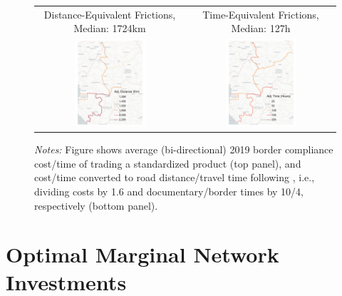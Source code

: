 \documentclass[a4paper]{article}
\begin{document}
\begin{figure}[H]
{\begin{tabular}{cc}
Distance-Equivalent Frictions, Median: 1724km & Time-Equivalent Frictions, Median: 127h \\
\includegraphics[width=0.5\textwidth, trim= {1cm 0 1cm 0}, clip]{"../figures/trade_costs/DBS_border_dist_km_adj_map.pdf"}  & 
\includegraphics[width=0.5\textwidth, trim= {1cm 0 1cm 0}, clip]{"../figures/trade_costs/DBS_border_time_hours_adj_map.pdf"} \\ [-0.3em] 
\end{tabular}
} 
\raggedright
\scriptsize 
\emph{Notes:} Figure shows average (bi-directional) 2019 border compliance cost/time of trading a standardized product (top panel), and cost/time converted to road distance/travel time following \citet{krantz2024optimal}, i.e., dividing costs by 1.6 and documentary/border times by 10/4, respectively (bottom panel). \vspace{-5mm}
\end{figure}

\newpage
  
  
\section{Optimal Marginal Network Investments}
\end{document}

